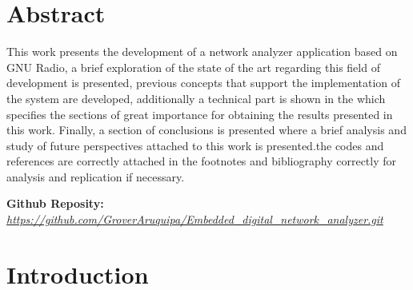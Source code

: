 \documentclass[12pt, twoside]{report}
\begin{document}
\pagebreak



\pagebreak

\chapter{Abstract}
This work presents the development of a network analyzer application based on GNU Radio, a brief exploration of the state of the art regarding this field of development is presented, previous concepts that support the implementation of the system are developed, additionally a technical part is shown in the which specifies the sections of great importance for obtaining the results presented in this work. Finally, a section of conclusions is presented where a brief analysis and study of future perspectives attached to this work is presented.the codes and references are correctly attached in the footnotes and bibliography correctly for analysis and replication if necessary.\\
\newline

\textbf{Github Reposity:} \textit{\url{https://github.com/GroverAruquipa/Embedded_digital_network_analyzer.git}}


\setcounter{page}{1}
\chapter{Introduction}
\end{document}
